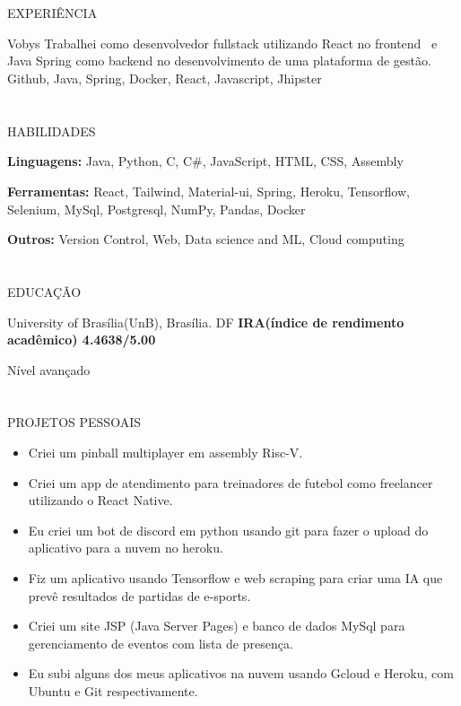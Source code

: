 \documentclass{my_cvPT}
\begin{document}
\begin{multicols}{2}
\section{\faPencil}{EXPERIÊNCIA}
    
%
    {Vobys}%
    {Trabalhei como desenvolvedor fullstack utilizando React no frontend
     \ e Java Spring como backend no desenvolvimento de uma plataforma de gestão.}%
    {Github, Java, Spring, Docker, React, Javascript, Jhipster}
    
\section{\faList}{HABILIDADES}

\textbf{Linguagens:} Java, Python, C, C\#, JavaScript, HTML, CSS, Assembly

\noindent\textbf{Ferramentas:} React, Tailwind, Material-ui, Spring, Heroku, Tensorflow, Selenium, MySql, Postgresql, NumPy, Pandas, Docker

\noindent\textbf{Outros:} Version Control, Web, Data science and ML, Cloud computing

\section{\faGraduationCap}{EDUCAÇÃO}

{University of Brasília(UnB), Brasília. DF} %
{\textbf{IRA(índice de rendimento acadêmico) 4.4638/5.00}}

{Nível avançado} %
{}

\columnbreak

\section{\faPaintBrush}{PROJETOS PESSOAIS}
\begin{itemize}[noitemsep]
    \item Criei um pinball multiplayer em assembly Risc-V.
    \item Criei um app de atendimento para treinadores de futebol como freelancer utilizando o React Native.
    \item Eu criei um bot de discord em python usando git para fazer o upload do aplicativo para a nuvem no heroku.
    \item Fiz um aplicativo usando Tensorflow e web scraping para criar uma IA que prevê resultados de partidas de e-sports.
    \item Criei um site JSP (Java Server Pages) e banco de dados MySql para gerenciamento de eventos com lista de presença.
    \item Eu subi alguns dos meus aplicativos na nuvem usando Gcloud e Heroku, com Ubuntu e Git respectivamente.
\end{itemize}


\end{multicols}
\end{document}
